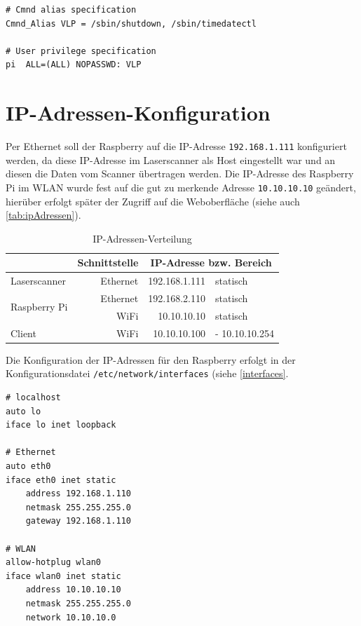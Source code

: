 \documentclass[a4paper,12pt,bibliography=totoc, listof=totoc,titlepage,pointlessnumbers]{scrreprt}
\newcommand{\code}[1]{\texttt{#1}}
\begin{document}
\begin{lstlisting}[caption={Änderung der \code{/etc/sudoers}}, label={Lsudoers}]
# Cmnd alias specification
Cmnd_Alias VLP = /sbin/shutdown, /sbin/timedatectl

# User privilege specification
pi	ALL=(ALL) NOPASSWD: VLP
\end{lstlisting}

\section{IP-Adressen-Konfiguration}
Per Ethernet soll der Raspberry auf die IP-Adresse \code{192.168.1.111} konfiguriert werden, da diese IP-Adresse im Laserscanner als Host eingestellt war und an diesen die Daten vom Scanner übertragen werden. Die IP-Adresse des Raspberry Pi im WLAN wurde fest auf die gut zu merkende Adresse \code{10.10.10.10} geändert, hierüber erfolgt später der Zugriff auf die Weboberfläche (siehe auch \autoref{tab:ipAdressen}).

\begin{table}[]
\centering
\begin{tabular}{l|r|r|l|}
\cline{2-4}
                                                    & Schnittstelle & \multicolumn{2}{c|}{IP-Adresse bzw. Bereich} \\ \hline
\multicolumn{1}{|l|}{Laserscanner}                  & Ethernet      & 192.168.1.111        & statisch              \\ \hline
\multicolumn{1}{|l|}{\multirow{2}{*}{Raspberry Pi}} & Ethernet      & 192.168.2.110        & statisch              \\ \cline{2-4} 
\multicolumn{1}{|l|}{}                              & WiFi          & 10.10.10.10          & statisch              \\ \hline
\multicolumn{1}{|l|}{Client}                        & WiFi          & 10.10.10.100         & - 10.10.10.254        \\ \hline
\end{tabular}
\caption{IP-Adressen-Verteilung}
\label{tab:ipAdressen}
\end{table}

Die Konfiguration der IP-Adressen für den Raspberry erfolgt in der Konfigurationsdatei \code{/etc/network/interfaces} (siehe \autoref{interfaces}. \cite{accesspoint}

\begin{lstlisting}[caption={Konfiguration der \code{/etc/network/interfaces}}, label={interfaces}]
# localhost
auto lo
iface lo inet loopback

# Ethernet
auto eth0
iface eth0 inet static
	address 192.168.1.110
	netmask 255.255.255.0
	gateway 192.168.1.110

# WLAN
allow-hotplug wlan0
iface wlan0 inet static
	address 10.10.10.10
	netmask 255.255.255.0
	network 10.10.10.0
\end{lstlisting}
\end{document}
